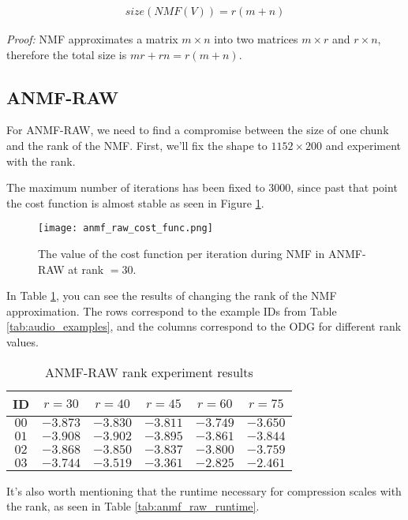 \begin{align}
\label{equ:nmf_size}
size(NMF(V)) = r(m+n)
\end{align}

\emph{Proof:} NMF approximates a matrix $m \times n$ into two matrices $m \times r$ and $r \times n$, therefore the total size is $mr + rn = r(m+n)$.

\subsection{ANMF-RAW}
For ANMF-RAW, we need to find a compromise between the size of one chunk and the rank of the NMF. First, we'll fix the shape to $1152 \times 200$ and experiment with the rank.

The maximum number of iterations has been fixed to 3000, since past that point the cost function is almost stable as seen in Figure \ref{fig:anmf_raw_cost_func}.

\begin{figure}[ht]
	\caption[ANMF-RAW cost function]{The value of the cost function per iteration during NMF in ANMF-RAW at rank $= 30$.}
	\label{fig:anmf_raw_cost_func}
	\centering
	\texttt{[image: anmf\_raw\_cost\_func.png]}
\end{figure}

In Table \ref{tab:anmf_raw_rank}, you can see the results of changing the rank of the NMF approximation. The rows correspond to the example IDs from Table \ref{tab:audio_examples}, and the columns correspond to the ODG for different rank values.

\begin{table}[htbp]\caption{ANMF-RAW rank experiment results}
	\label{tab:anmf_raw_rank}
	\centering
	\begin{tabular}{|c|c|c|c|c|c|}
		\hline
		ID & $r=30$ & $r=40$ & $r=45$ & $r=60$ & $r=75$ \\ \hline
		$00$ & $-3.873$ & $-3.830$ & $-3.811$ & $-3.749$ & $-3.650$ \\
		$01$ & $-3.908$ & $-3.902$ & $-3.895$ & $-3.861$ & $-3.844$ \\
		$02$ & $-3.868$ & $-3.850$ & $-3.837$ & $-3.800$ & $-3.759$ \\
		$03$ & $-3.744$ & $-3.519$ & $-3.361$ & $-2.825$ & $-2.461$ \\		
		\hline
	\end{tabular}
\end{table}

It's also worth mentioning that the runtime necessary for compression scales with the rank, as seen in Table \ref{tab:anmf_raw_runtime}.

